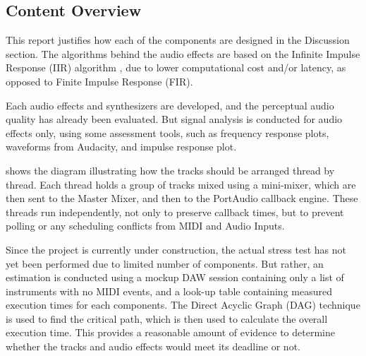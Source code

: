 \subsection{Content Overview}

This report justifies how each of the components are designed in the Discussion section.
The algorithms behind the audio effects are based on the Infinite Impulse Response (IIR) algorithm \cite{SteveWinder2002C1},
due to lower computational cost and/or latency, as opposed to Finite Impulse Response (FIR).

Each audio effects and synthesizers are developed, and the perceptual audio
quality has already been evaluated. But signal analysis is conducted for audio effects only,
using some assessment tools, such as frequency response plots, waveforms from Audacity,
and impulse response plot.

 shows the diagram illustrating how the tracks should be arranged thread by thread. Each thread
holds a group of tracks mixed using a mini-mixer, which are then sent to the Master Mixer, and then to the PortAudio
callback engine. These threads run independently, not only to preserve callback times, but to prevent polling
or any scheduling conflicts from MIDI and Audio Inputs.



Since the project is currently under construction, the actual 
stress test has not yet been performed due to limited number of components. But rather, an estimation
is conducted using a mockup DAW session containing only a list of instruments with no MIDI events,
and a look-up table containing measured execution times for each components. The Direct Acyclic Graph (DAG) 
technique \cite{susser_adc2025} is used to find the critical path, which is then used to calculate the overall 
execution time. This provides a reasonable amount of evidence to determine whether the tracks and audio effects 
would meet its deadline or not.
